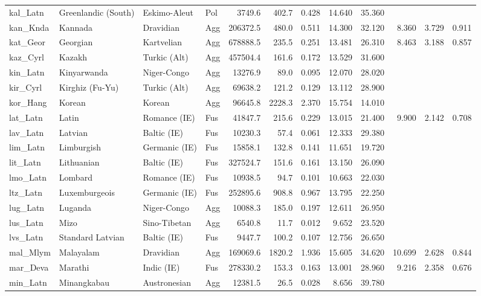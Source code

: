 \begin{tabular}{ll l l rr rr r rr r}
kal\_Latn & Greenlandic (South) & Eskimo-Aleut & Pol & 3749.6 & 402.7 & 0.428 & 14.640 & 35.360 &  &  &  \\
kan\_Knda & Kannada & Dravidian & Agg & 206372.5 & 480.0 & 0.511 & 14.300 & 32.120 & 8.360 & 3.729 & 0.911 \\
kat\_Geor & Georgian & Kartvelian & Agg & 678888.5 & 235.5 & 0.251 & 13.481 & 26.310 & 8.463 & 3.188 & 0.857 \\
kaz\_Cyrl & Kazakh & Turkic (Alt) & Agg & 457504.4 & 161.6 & 0.172 & 13.529 & 31.600 &  &  &  \\
kin\_Latn & Kinyarwanda & Niger-Congo & Agg & 13276.9 & 89.0 & 0.095 & 12.070 & 28.020 &  &  &  \\
kir\_Cyrl & Kirghiz (Fu-Yu) & Turkic (Alt) & Agg & 69638.2 & 121.2 & 0.129 & 13.112 & 28.900 &  &  &  \\
kor\_Hang & Korean & Korean & Agg & 96645.8 & 2228.3 & 2.370 & 15.754 & 14.010 &  &  &  \\
lat\_Latn & Latin & Romance (IE) & Fus & 41847.7 & 215.6 & 0.229 & 13.015 & 21.400 & 9.900 & 2.142 & 0.708 \\
lav\_Latn & Latvian & Baltic (IE) & Fus & 10230.3 & 57.4 & 0.061 & 12.333 & 29.380 &  &  &  \\
lim\_Latn & Limburgish & Germanic (IE) & Fus & 15858.1 & 132.8 & 0.141 & 11.651 & 19.720 &  &  &  \\
lit\_Latn & Lithuanian & Baltic (IE) & Fus & 327524.7 & 151.6 & 0.161 & 13.150 & 26.090 &  &  &  \\
lmo\_Latn & Lombard & Romance (IE) & Fus & 10938.5 & 94.7 & 0.101 & 10.663 & 22.030 &  &  &  \\
ltz\_Latn & Luxemburgeois & Germanic (IE) & Fus & 252895.6 & 908.8 & 0.967 & 13.795 & 22.250 &  &  &  \\
lug\_Latn & Luganda & Niger-Congo & Agg & 10088.3 & 185.0 & 0.197 & 12.611 & 26.950 &  &  &  \\
lus\_Latn & Mizo & Sino-Tibetan & Agg & 6540.8 & 11.7 & 0.012 & 9.652 & 23.520 &  &  &  \\
lvs\_Latn & Standard Latvian & Baltic (IE) & Fus & 9447.7 & 100.2 & 0.107 & 12.756 & 26.650 &  &  &  \\
mal\_Mlym & Malayalam & Dravidian & Agg & 169069.6 & 1820.2 & 1.936 & 15.605 & 34.620 & 10.699 & 2.628 & 0.844 \\
mar\_Deva & Marathi & Indic (IE) & Fus & 278330.2 & 153.3 & 0.163 & 13.001 & 28.960 & 9.216 & 2.358 & 0.676 \\
min\_Latn & Minangkabau & Austronesian & Agg & 12381.5 & 26.5 & 0.028 & 8.656 & 39.780 &  &  &  \\

\end{tabular}

